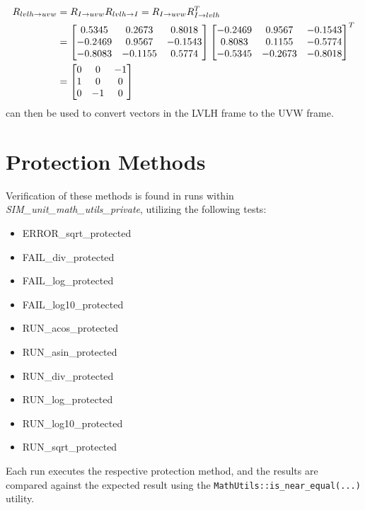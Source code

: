\documentclass[11pt,fleqn]{report}
\begin{document}
\begin{align*}
 \hfill R_{lvlh\rightarrow uvw} &=
R_{I\rightarrow uvw} R_{lvlh\rightarrow I} =
R_{I\rightarrow uvw} R_{I\rightarrow lvlh}^T \hfill \\
 \hfill &= \begin{bmatrix} 0.5345 & 0.2673 & 0.8018 \\
-0.2469 & 0.9567 & -0.1543 \\
-0.8083 & -0.1155 & 0.5774
 \end{bmatrix}
 \begin{bmatrix} -0.2469 & 0.9567 & -0.1543 \\
0.8083 & 0.1155 & -0.5774 \\
 -0.5345 & -0.2673 & -0.8018
 \end{bmatrix}^T\hfill \\
 \hfill &= \begin{bmatrix} 0 & 0 & -1 \\
 1 & 0 & 0 \\
 0 & -1 & 0
 \end{bmatrix} \hfill
\end{align*}
can then be used to convert vectors in the LVLH frame to the UVW frame.

\section{Protection Methods}
Verification of these methods is found in runs within
\textit{SIM\_unit\_math\_utils\_private}, utilizing the following tests:
\begin{itemize}
 \item ERROR\_sqrt\_protected
 \item FAIL\_div\_protected
 \item FAIL\_log\_protected
 \item FAIL\_log10\_protected
 \item RUN\_acos\_protected
 \item RUN\_asin\_protected
 \item RUN\_div\_protected
 \item RUN\_log\_protected
 \item RUN\_log10\_protected
 \item RUN\_sqrt\_protected
\end{itemize}

Each run executes the respective protection method, and the results are
compared against the expected result using the
\texttt{MathUtils::is\_near\_equal(...)} utility.
\end{document}

